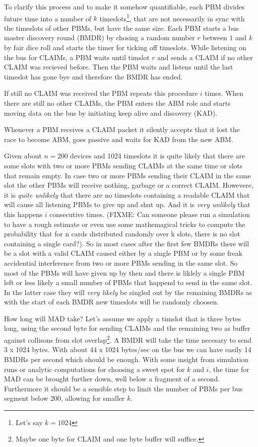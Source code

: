 \documentclass[a4paper,12pt]{scrartcl}
\begin{document}
To clarify this process and to make it somehow quantifiable, each PBM divides future time into a number of
$k$ timeslots\footnote{Let's say $k=1024$}, that are not necessarily in sync with the
timeslots of other PBMs, but have the same size.
Each PBM starts a bus master discovery round (BMDR) by chosing a random number $r$ between $1$ and $k$ by fair dice roll
and starts the timer for ticking off timeslots.
While listening on the bus for CLAIMs, a PBM waits until timslot $r$ and sends a CLAIM if no other CLAIM was recieved before.
Then the PBM waits and listens until the last timeslot has gone bye and therefore the BMDR has ended.

If still no CLAIM was received the PBM repeats this procedure $i$ times.
When there are still no other CLAIMs, the PBM enters the ABM role and starts moving data on the bus by initiating keep alive and discovery (KAD).

Whenever a PBM receives a CLAIM packet it silently accepts that it lost the race to become ABM, goes passive and waits for KAD from the new ABM.

Given about $n=200$ devices and 1024 timeslots it is quite likely that there are some slots with two or more PBMs sending CLAIMs at the same time or slots that remain empty.
In case two or more PBMs sending their CLAIM in the same slot the other PBMs will receive nothing, garbage or a correct CLAIM.
Howevere, it is \emph{quite unlikely} that there are no timeslots containing a readable CLAIM that will cause all listening PBMs to give up and shut up.
And it is \emph{very unlikely} that this happens $i$ consecutive times.
(FIXME: Can someone please run a simulation to have a rough estimate or even use some mathemagical tricks to compute the probability that for n cards
distributed randomly over k slots, there is no slot containing a single card?).
So in most cases after the first few BMDRs there will be a slot with a valid CLAIM caused either by a single PBM or by some freak accidential interference from two
or more PBMs sending in the same slot.
So most of the PBMs will have given up by then and there is liklely a single PBM left or less likely a small number of PBMs that happend to send in the same slot. 
In the latter case they will \emph{very likely} be singled out by the remaining BMDRs as with the start of each BMDR new timeslots will be randomly choosen.

How long will MAD take? Let's assume we apply a timslot that is three bytes long, using the second byte for sending CLAIMs and the remaining two as
buffer against collisons from slot overlap\footnote{Maybe one byte for CLAIM and one byte buffer will suffice.}.
A BMDR will take the time necesary to send 3 x 1024 bytes.
With about 44 x 1024 bytes/sec on the bus we can have easily 14 BMDRs per second which should be enough.
With some insight from simulation runs or analytic computations for choosing a sweet spot for $k$ and $i$, the time for MAD can be brought further down,
well below a fragment of a second.
Furthermore it should be a sensible step to limit the number of PBMs per bus segment below 200, allowing for smaller $k$.
\end{document}
